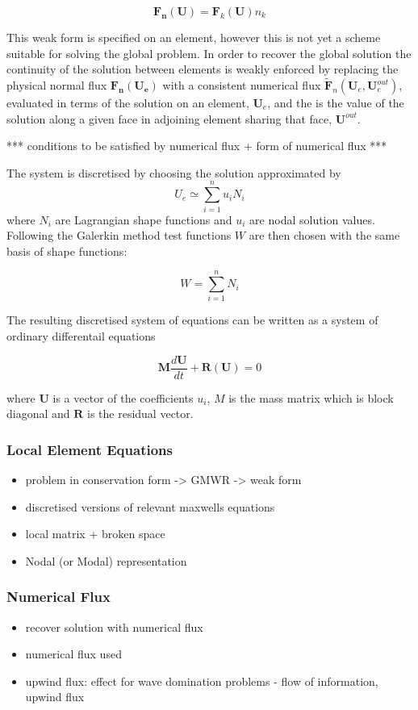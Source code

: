 $$
\mathbf{F_n}(\mathbf{U}) = \mathbf{F}_k(\mathbf{U}) n_k
$$

This weak form is specified on an element, however this is not yet a scheme suitable for solving the global problem. In order to recover the global solution the continuity of the solution between elements is weakly enforced by replacing the physical normal flux $\mathbf{F_n}(\mathbf{U_e})$ with a consistent numerical flux $\mathbf{\tilde{F}}_n(\mathbf{U}_e,\mathbf{U}_e^{out})$, evaluated in terms of the solution on an element, $\mathbf{U}_e$, and the is the value of the solution along a given face in adjoining element sharing that face, $\mathbf{U}^{out}$.

*** conditions to be satisfied by numerical flux + form of numerical flux ***

The system is discretised by choosing the solution approximated by
$$
U_e \simeq \sum_{i=1}^{n} u_{i} N_{i}
$$
where $N_{i}$ are Lagrangian shape functions and $u_{i}$ are nodal solution values. Following the Galerkin method test functions $W$ are then chosen with the same basis of shape functions:

$$
W = \sum_{i=1}^{n} N_{i}
$$

The resulting discretised system of equations can be written as a system of ordinary differentail equations

$$
\mathbf{M} \frac{d \mathbf{U}} {dt} + \mathbf{R}(\mathbf{U}) = 0
$$

where $\mathbf{U}$ is a vector of the coefficients $u_{i}$, $M$ is the mass matrix which is block diagonal and $\mathbf{R}$ is the residual vector.

\subsubsection{Local Element Equations}
\begin{itemize}
  \item problem in conservation form -> GMWR -> weak form
  \item discretised versions of relevant maxwells equations
	\item local matrix + broken space
	\item Nodal (or Modal) representation
\end{itemize}
\subsubsection{Numerical Flux}

\begin{itemize}
	\item recover solution with numerical flux
  \item numerical flux used
	\item upwind flux: effect for wave domination problems - flow of information, upwind flux
\end{itemize}

